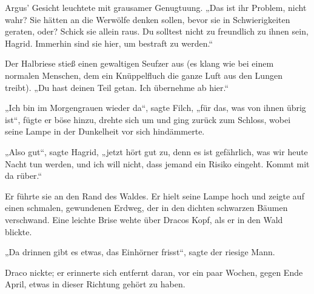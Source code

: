 Argus’ Gesicht leuchtete mit grausamer Genugtuung.
„Das ist ihr Problem, nicht wahr? Sie hätten an die Werwölfe denken sollen, bevor sie in Schwierigkeiten geraten, oder? Schick sie allein raus. Du solltest nicht zu freundlich zu ihnen sein, Hagrid. Immerhin sind sie hier, um bestraft zu werden.“

Der Halbriese stieß einen gewaltigen Seufzer aus (es klang wie bei einem normalen Menschen, dem ein Knüppelfluch die ganze Luft aus den Lungen treibt).
„Du hast deinen Teil getan. Ich übernehme ab hier.“

„Ich bin im Morgengrauen wieder da“, sagte Filch, „für das, was von ihnen übrig ist“, fügte er böse hinzu, drehte sich um und ging zurück zum Schloss, wobei seine Lampe in der Dunkelheit vor sich hindämmerte.

„Also gut“, sagte Hagrid, „jetzt hört gut zu, denn es ist gefährlich, was wir heute Nacht tun werden, und ich will nicht, dass jemand ein Risiko eingeht. Kommt mit da rüber.“

Er führte sie an den Rand des Waldes. Er hielt seine Lampe hoch und zeigte auf einen schmalen, gewundenen Erdweg, der in den dichten schwarzen Bäumen verschwand. Eine leichte Brise wehte über Dracos Kopf, als er in den Wald blickte.

„Da drinnen gibt es etwas, das Einhörner frisst“, sagte der riesige Mann.

Draco nickte; er erinnerte sich entfernt daran, vor ein paar Wochen, gegen Ende April, etwas in dieser Richtung gehört zu haben.

